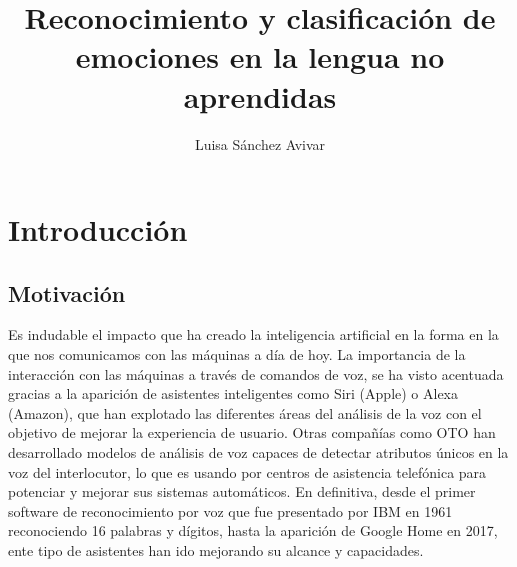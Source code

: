 \documentclass[11pt,a4paper,spanish]{book}
\begin{document}
	\title{Reconocimiento y clasificación de emociones en la lengua no aprendidas}
	\author{Luisa Sánchez Avivar}
	
	
	\mainmatter
	\chapter{Introducción}
	
	
	\section{Motivación}
	\begin{comment}
		Affective computing opens a new area of research in computer science with the aim to improve the way how humans and machines interact. Recognition of human emotions by machines is becoming a significant focus in recent research in different disciplines related to information sciences and Human-Computer Interaction (HCI)
		Humans verbally communicate by speech and
		language. This enables faster sharing of messages, conveying of ideas and spreading of inventions. Communication between humans is actually not just what humans say, but also how they say it. Furthermore, facial expressions, as a part of non-verbal communication, are responsible for about 55%
		S.Lugovic
	\end{comment}	
	Es indudable el impacto que ha creado la inteligencia artificial en la forma en la que nos comunicamos con las máquinas a día de hoy. La importancia de la interacción con las máquinas a través de comandos de voz, se ha visto acentuada gracias a la aparición de asistentes inteligentes como Siri (Apple) o Alexa (Amazon), que han explotado las diferentes áreas del análisis de la voz con el objetivo de mejorar la experiencia de usuario. Otras compañías como OTO han desarrollado modelos de análisis de voz capaces de detectar atributos únicos en la voz del interlocutor, lo que es usando por centros de asistencia telefónica para potenciar y mejorar sus sistemas automáticos.
	En definitiva, desde el primer software de reconocimiento por voz que fue presentado por IBM en 1961 reconociendo 16 palabras y dígitos, hasta la aparición de Google Home en 2017, ente tipo de asistentes han ido mejorando su alcance y capacidades.\\
	
\end{document}
